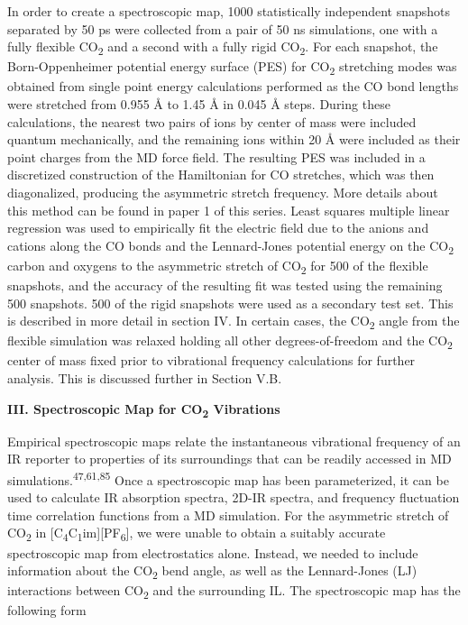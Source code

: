 \documentclass[]{article}
\begin{document}
In order to create a spectroscopic map, 1000 statistically independent snapshots separated by 50 ps were collected from a pair of 50 ns simulations, one with a fully flexible CO\textsubscript{2} and a second with a fully rigid CO\textsubscript{2}. For each snapshot, the Born-Oppenheimer potential energy surface (PES) for CO\textsubscript{2} stretching modes was obtained from single point energy calculations performed as the CO bond lengths were stretched from 0.955 Å to 1.45 Å in 0.045 Å steps. During these calculations, the nearest two pairs of ions by center of mass were included quantum mechanically, and the remaining ions within 20 Å were included as their point charges from the MD force field. The resulting PES was included in a discretized construction of the Hamiltonian for CO stretches, which was then diagonalized, producing the asymmetric stretch frequency. More details about this method can be found in paper 1 of this series. Least squares multiple linear regression was used to empirically fit the electric field due to the anions and cations along the CO bonds and the Lennard-Jones potential energy on the CO\textsubscript{2} carbon and oxygens to the asymmetric stretch of CO\textsubscript{2} for 500 of the flexible snapshots, and the accuracy of the resulting fit was tested using the remaining 500 snapshots. 500 of the rigid snapshots were used as a secondary test set. This is described in more detail in section IV.  In certain cases, the CO\textsubscript{2} angle from the flexible simulation was relaxed holding all other degrees-of-freedom and the CO\textsubscript{2} center of mass fixed prior to vibrational frequency calculations for further analysis. This is discussed further in Section V.B.

\textbf{III. Spectroscopic Map for CO\textsubscript{2} Vibrations}

Empirical spectroscopic maps relate the instantaneous vibrational frequency of an IR reporter to properties of its surroundings that can be readily accessed in MD simulations.\textsuperscript{47,61,85} Once a spectroscopic map has been parameterized, it can be used to calculate IR absorption spectra, 2D-IR spectra, and frequency fluctuation time correlation functions from a MD simulation. For the asymmetric stretch of CO\textsubscript{2} in {[}C\textsubscript{4}C\textsubscript{1}im{]}{[}PF\textsubscript{6}{]}, we were unable to obtain a suitably accurate spectroscopic map from electrostatics alone. Instead, we needed to include information about the CO\textsubscript{2} bend angle, as well as the Lennard-Jones (LJ) interactions between CO\textsubscript{2} and the surrounding IL. The spectroscopic map has the following form
\end{document}
